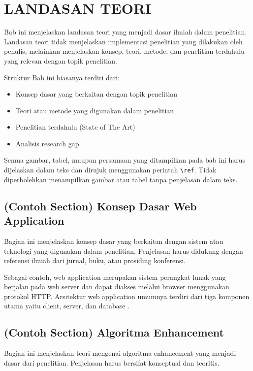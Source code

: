 \chapter{LANDASAN TEORI}

Bab ini menjelaskan landasan teori yang menjadi dasar ilmiah dalam penelitian.
Landasan teori tidak menjelaskan implementasi penelitian yang dilakukan oleh
penulis, melainkan menjelaskan konsep, teori, metode, dan penelitian terdahulu
yang relevan dengan topik penelitian.

Struktur Bab ini biasanya terdiri dari:
\begin{itemize}
\item Konsep dasar yang berkaitan dengan topik penelitian
\item Teori atau metode yang digunakan dalam penelitian
\item Penelitian terdahulu (State of The Art)
\item Analisis research gap
\end{itemize}

Semua gambar, tabel, maupun persamaan yang ditampilkan pada bab ini harus
dijelaskan dalam teks dan dirujuk menggunakan perintah \texttt{\textbackslash ref}.
Tidak diperbolehkan menampilkan gambar atau tabel tanpa penjelasan dalam teks.

\section{(Contoh Section) Konsep Dasar Web Application}

Bagian ini menjelaskan konsep dasar yang berkaitan dengan sistem atau teknologi
yang digunakan dalam penelitian. Penjelasan harus didukung dengan referensi
ilmiah dari jurnal, buku, atau prosiding konferensi.

Sebagai contoh, web application merupakan sistem perangkat lunak yang berjalan
pada web server dan dapat diakses melalui browser menggunakan protokol HTTP.
Arsitektur web application umumnya terdiri dari tiga komponen utama yaitu
client, server, dan database \parencite{llama2024}.

\section{(Contoh Section) Algoritma Enhancement}

Bagian ini menjelaskan teori mengenai algoritma enhancement yang menjadi dasar
dari penelitian. Penjelasan harus bersifat konseptual dan teoritis.

